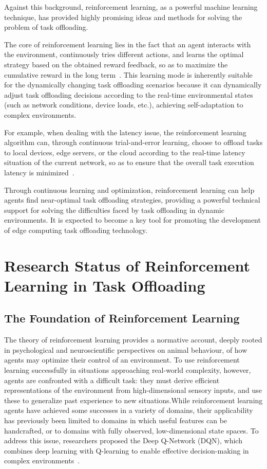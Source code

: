\documentclass[journal]{IEEEtran}
\begin{document}
Against this background, reinforcement learning, as a powerful machine learning technique, has provided highly promising ideas and methods for solving the problem of task offloading.

The core of reinforcement learning lies in the fact that an agent interacts with the environment, 
continuously tries different actions, and learns the optimal strategy based on the obtained reward feedback, 
so as to maximize the cumulative reward in the long term~\cite{zheng05}. 
This learning mode is inherently suitable for the dynamically changing task offloading scenarios 
because it can dynamically adjust task offloading decisions according to the real-time environmental states 
(such as network conditions, device loads, etc.), achieving self-adaptation to complex environments.

For example, when dealing with the latency issue, the reinforcement learning algorithm can, through continuous trial-and-error learning, choose to offload tasks to local devices, edge servers, or the cloud according to the real-time latency situation of the current network, so as to ensure that the overall task execution latency is minimized~\cite{zheng06}.

Through continuous learning and optimization, reinforcement learning can help agents find near-optimal task offloading strategies, providing a powerful technical support for solving the difficulties faced by task offloading in dynamic environments. It is expected to become a key tool for promoting the development of edge computing task offloading technology.

\section{Research Status of Reinforcement Learning in Task Offloading}

\subsection{The Foundation of Reinforcement Learning}
The theory of reinforcement learning provides a normative account, deeply rooted in psychological and neuroscientific perspectives on animal behaviour, of how agents may optimize their control of an environment. To use reinforcement learning successfully in situations approaching real-world complexity, however, agents are confronted with a difficult task: they must derive efficient representations of the environment from high-dimensional sensory inputs, and use these to generalize past experience to new situations.While reinforcement learning agents have achieved some successes in a variety of domains, their applicability has previously been limited to domains in which useful features can be handcrafted, or to domains with fully observed, low-dimensional state spaces. To address this issue, researchers proposed the Deep Q-Network (DQN), which combines deep learning with Q-learning to enable effective decision-making in complex environments~\cite{pyyz001}.
\end{document}

